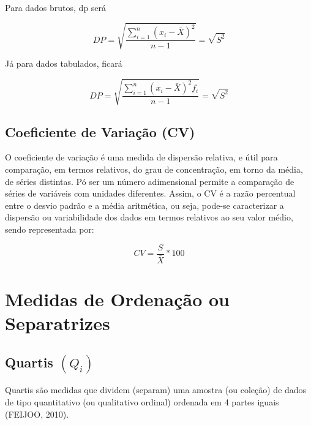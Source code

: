 Para dados brutos, dp será

\begin{equation}\label{dp}
    DP= \sqrt{\frac{\sum_{i=1}^{n}(x_{i}-\bar{X})^{2}}{n-1}} = \sqrt{S^{2}}
\end{equation}

Já para dados tabulados, ficará

\begin{equation}\label{dp}
    DP= \sqrt{\frac{\sum_{i=1}^{n}(x_{i}-\bar{X})^{2}f_{i}}{n-1}} = \sqrt{S^{2}}
\end{equation}

\subsection{Coeficiente de Variação (CV)}

O coeficiente de variação é uma medida de dispersão relativa, e útil para comparação, em termos relativos, do grau de concentração, em torno da média, de séries distintas. Pó ser um número adimensional permite a comparação de séries de variáveis com unidades diferentes. Assim, o CV é a razão percentual entre o desvio padrão e a média aritmética, ou seja, pode-se caracterizar a dispersão ou variabilidade dos dados em termos relativos ao seu valor médio, sendo representada por:


\begin{equation}\label{CV}
    CV= \frac{S}{\bar{X}}*100
\end{equation}

\newpage

\section{Medidas de Ordenação ou Separatrizes}
\subsection{Quartis $(Q_{i})$}






Quartis são medidas que dividem (separam) uma amostra (ou coleção) de dados de tipo quantitativo (ou qualitativo ordinal) ordenada em 4 partes iguais (FEIJOO, 2010).



